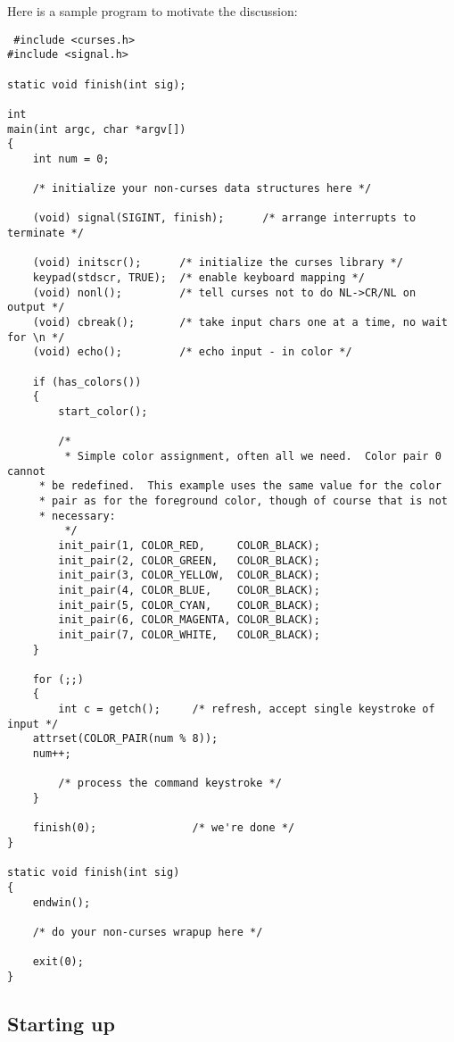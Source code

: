 Here is a sample program to motivate the discussion:
\begin{verbatim} #include <curses.h>
#include <signal.h>

static void finish(int sig);

int
main(int argc, char *argv[])
{
    int num = 0;

    /* initialize your non-curses data structures here */

    (void) signal(SIGINT, finish);      /* arrange interrupts to terminate */

    (void) initscr();      /* initialize the curses library */
    keypad(stdscr, TRUE);  /* enable keyboard mapping */
    (void) nonl();         /* tell curses not to do NL->CR/NL on output */
    (void) cbreak();       /* take input chars one at a time, no wait for \n */
    (void) echo();         /* echo input - in color */

    if (has_colors())
    {
        start_color();

        /*
         * Simple color assignment, often all we need.  Color pair 0 cannot
	 * be redefined.  This example uses the same value for the color
	 * pair as for the foreground color, though of course that is not
	 * necessary:
         */
        init_pair(1, COLOR_RED,     COLOR_BLACK);
        init_pair(2, COLOR_GREEN,   COLOR_BLACK);
        init_pair(3, COLOR_YELLOW,  COLOR_BLACK);
        init_pair(4, COLOR_BLUE,    COLOR_BLACK);
        init_pair(5, COLOR_CYAN,    COLOR_BLACK);
        init_pair(6, COLOR_MAGENTA, COLOR_BLACK);
        init_pair(7, COLOR_WHITE,   COLOR_BLACK);
    }

    for (;;)
    {
        int c = getch();     /* refresh, accept single keystroke of input */
	attrset(COLOR_PAIR(num % 8));
	num++;

        /* process the command keystroke */
    }

    finish(0);               /* we're done */
}

static void finish(int sig)
{
    endwin();

    /* do your non-curses wrapup here */

    exit(0);
}
\end{verbatim}

\subsection{Starting up}

